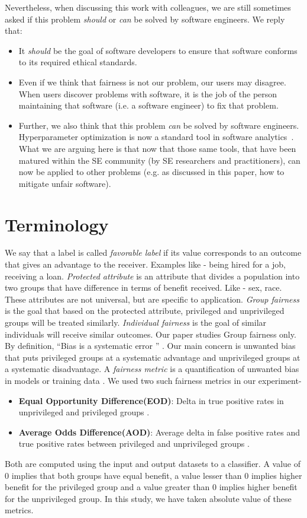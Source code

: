 \documentclass[10pt,conference,review]{IEEEtran}
\newcommand{\bi}{\begin{itemize}}
\newcommand{\ei}{\end{itemize}}
\begin{document}
Nevertheless,   when discussing this work with colleagues, we are still sometimes
asked if this problem {\em should}
or {\em can} be solved by 
software engineers. We reply that:
\bi
\item
It {\em should} be the goal of  software developers to ensure
that software conforms to  its
required ethical standards.
\item
Even if we think that  fairness is not our
problem, our users may disagree.
When users discover problems with software, it is the job of
the person maintaining that software (i.e.  a software engineer) to fix that problem.
\item
Further, we also think that this problem {\em can} be solved by software engineers. Hyperparameter optimization is now a standard tool
in software analytics~\cite{xia2018hyperparameter,osman2017hyperparameter}. What we are arguing here is that now that those same tools, that  have been matured within the SE community (by SE researchers and practitioners),
can now be applied to other problems (e.g.  as discussed in this paper, how to  mitigate unfair software).
\ei
 

\section{Terminology}

We say that a label is called \textit{favorable label} if its  value corresponds to an outcome that gives an advantage to the receiver. Examples like - being hired for a job, receiving a loan. \textit{Protected attribute} is an attribute that divides a population into two groups that have difference in terms of benefit received. Like - sex, race. These attributes are not universal, but are specific to application. \textit{Group fairness} is the goal that based on the protected attribute, privileged and unprivileged groups will be treated similarly. \textit{Individual fairness} is the goal of similar individuals will receive similar outcomes.  Our paper studies Group fairness only.
By definition, ``Bias is a systematic error '' \cite{bias_systemetic}. Our main concern is unwanted bias that puts privileged groups at a systematic advantage and unprivileged groups at a systematic disadvantage. A \textit{fairness metric} is a quantification of unwanted bias in models or training data \cite{IBM}. We used two such fairness metrics in our experiment-

\bi
\item \textbf{Equal Opportunity Difference(EOD)}:  Delta in true positive rates in unprivileged and privileged groups \cite{IBM}. 
\item \textbf{Average Odds Difference(AOD)}: Average delta in false positive rates and true positive rates between privileged and unprivileged groups \cite{IBM}.
\ei
Both are computed using the input and output datasets to a classifier. A value of 0 implies that both groups have equal benefit, a value lesser than 0 implies higher benefit for the privileged group and a value greater than 0 implies higher benefit for the unprivileged group. In this study, we have taken absolute value of these metrics. 
\end{document}
